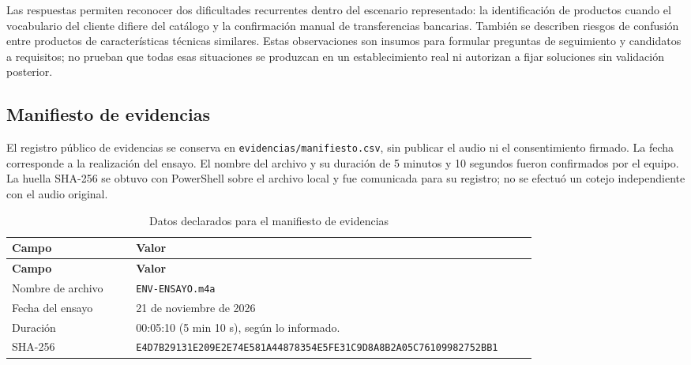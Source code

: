 Las respuestas permiten reconocer dos dificultades recurrentes dentro del escenario representado: la identificación de productos cuando el vocabulario del cliente difiere del catálogo y la confirmación manual de transferencias bancarias. También se describen riesgos de confusión entre productos de características técnicas similares. Estas observaciones son insumos para formular preguntas de seguimiento y candidatos a requisitos; no prueban que todas esas situaciones se produzcan en un establecimiento real ni autorizan a fijar soluciones sin validación posterior.

\subsection{Manifiesto de evidencias}

El registro público de evidencias se conserva en \texttt{evidencias/manifiesto.csv}, sin publicar el audio ni el consentimiento firmado. La fecha corresponde a la realización del ensayo. El nombre del archivo y su duración de 5 minutos y 10 segundos fueron confirmados por el equipo. La huella SHA-256 se obtuvo con PowerShell sobre el archivo local y fue comunicada para su registro; no se efectuó un cotejo independiente con el audio original.

\begingroup
\small
\renewcommand{\arraystretch}{1.12}
\begin{longtable}{@{}p{0.22\linewidth}p{0.71\linewidth}@{}}
\caption{Datos declarados para el manifiesto de evidencias}\label{tab:ensayo-manifiesto}\\
\toprule
\textbf{Campo} & \textbf{Valor} \\
\midrule
\endfirsthead
\toprule
\textbf{Campo} & \textbf{Valor} \\
\midrule
\endhead
\bottomrule
\endlastfoot
Nombre de archivo & \texttt{ENV-ENSAYO.m4a} \\
Fecha del ensayo & 21 de noviembre de 2026 \\
Duración & 00:05:10 (5 min 10 s), según lo informado. \\
SHA-256 & \texttt{E4D7B29131E209E2E74E581A44878354}\newline\texttt{E5FE31C9D8A8B2A05C76109982752BB1} \\
\end{longtable}
\endgroup

